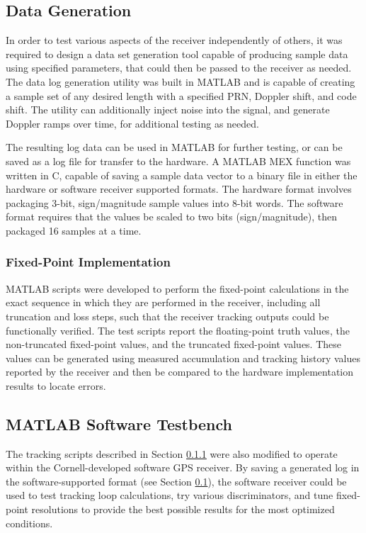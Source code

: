 \documentclass[12pt]{article}
\begin{document}
\subsection{Data Generation}
\label{sec:data generation}
In order to test various aspects of the receiver independently of others, it was required to design a data set generation tool capable of producing sample data using specified parameters, that could then be passed to the receiver as needed. The data log generation utility was built in MATLAB and is capable of creating a sample set of any desired length with a specified PRN, Doppler shift, and code shift. The utility can additionally inject noise into the signal, and generate Doppler ramps over time, for additional testing as needed.

The resulting log data can be used in MATLAB for further testing, or can be saved as a log file for transfer to the hardware. A MATLAB MEX function was written in C, capable of saving a sample data vector to a binary file in either the hardware or software receiver supported formats. The hardware format involves packaging 3-bit, sign/magnitude sample values into 8-bit words. The software format requires that the values be scaled to two bits (sign/magnitude), then packaged 16 samples at a time.

\subsubsection{Fixed-Point Implementation}
\label{sec:fixed-point implementation}
MATLAB scripts were developed to perform the fixed-point calculations in the exact sequence in which they are performed in the receiver, including all truncation and loss steps, such that the receiver tracking outputs could be functionally verified. The test scripts report the floating-point truth values, the non-truncated fixed-point values, and the truncated fixed-point values. These values can be generated using measured accumulation and tracking history values reported by the receiver and then be compared to the hardware implementation results to locate errors.

\subsection{MATLAB Software Testbench}
The tracking scripts described in Section \ref{sec:fixed-point implementation} were also modified to operate within the Cornell-developed software GPS receiver. By saving a generated log in the software-supported format (see Section \ref{sec:data generation}), the software receiver could be used to test tracking loop calculations, try various discriminators, and tune fixed-point resolutions to provide the best possible results for the most optimized conditions.
\end{document}
